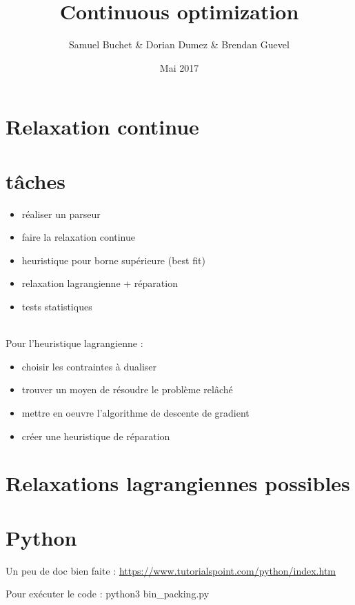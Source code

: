 \documentclass{article}
\title{Continuous optimization}
\author{Samuel Buchet \& Dorian Dumez \& Brendan Guevel}
\date{Mai 2017}
\begin{document}
\maketitle

\section{Relaxation continue}

\section{tâches}

\begin{itemize}
    \item réaliser un parseur
    \item faire la relaxation continue
    \item heuristique pour borne supérieure (best fit)
    \item relaxation lagrangienne + réparation
    \item tests statistiques
\end{itemize}
~\\
Pour l'heuristique lagrangienne :
\begin{itemize}
    \item choisir les contraintes à dualiser
    \item trouver un moyen de résoudre le problème relâché
    \item mettre en oeuvre l'algorithme de descente de gradient
    \item créer une heuristique de réparation
\end{itemize}

\section{Relaxations lagrangiennes possibles}

\section{Python}

Un peu de doc bien faite : \url{https://www.tutorialspoint.com/python/index.htm} \newline

Pour exécuter le code : python3 bin\_packing.py
\end{document}
